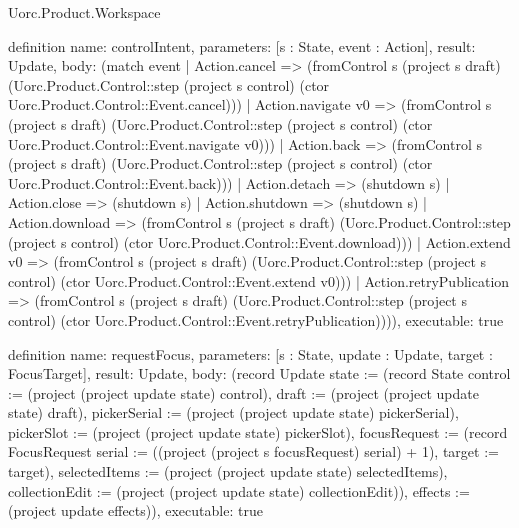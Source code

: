 \begin{lexlean}{Uorc.Product.Workspace}
\begin{semanticmodule}
definition{
  name: controlIntent,
  parameters: [s : State, event : Action],
  result: Update,
  body: (match event
    | Action.cancel => (fromControl s (project s draft) (Uorc.Product.Control::step (project s control) (ctor Uorc.Product.Control::Event.cancel)))
    | Action.navigate v0 => (fromControl s (project s draft) (Uorc.Product.Control::step (project s control) (ctor Uorc.Product.Control::Event.navigate v0)))
    | Action.back => (fromControl s (project s draft) (Uorc.Product.Control::step (project s control) (ctor Uorc.Product.Control::Event.back)))
    | Action.detach => (shutdown s)
    | Action.close => (shutdown s)
    | Action.shutdown => (shutdown s)
    | Action.download => (fromControl s (project s draft) (Uorc.Product.Control::step (project s control) (ctor Uorc.Product.Control::Event.download)))
    | Action.extend v0 => (fromControl s (project s draft) (Uorc.Product.Control::step (project s control) (ctor Uorc.Product.Control::Event.extend v0)))
    | Action.retryPublication => (fromControl s (project s draft) (Uorc.Product.Control::step (project s control) (ctor Uorc.Product.Control::Event.retryPublication)))),
  executable: true
}

definition{
  name: requestFocus,
  parameters: [s : State, update : Update, target : FocusTarget],
  result: Update,
  body: (record Update {state := (record State {control := (project (project update state) control), draft := (project (project update state) draft), pickerSerial := (project (project update state) pickerSerial), pickerSlot := (project (project update state) pickerSlot), focusRequest := (record FocusRequest {serial := ((project (project s focusRequest) serial) + 1), target := target}), selectedItems := (project (project update state) selectedItems), collectionEdit := (project (project update state) collectionEdit)}), effects := (project update effects)}),
  executable: true
}


\end{semanticmodule}
\end{lexlean}
